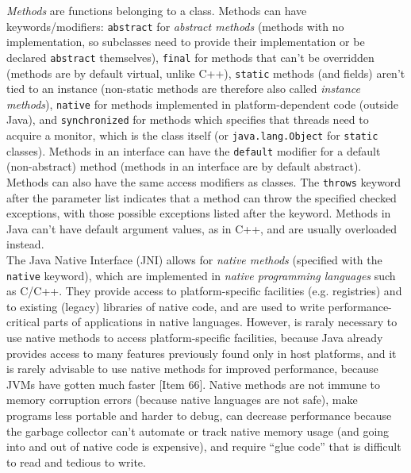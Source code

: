 \documentclass[table, xcdraw]{article}%
\begin{document}
\emph{Methods} are functions belonging to a class. Methods can have keywords/modifiers: \texttt{abstract} for \emph{abstract methods} (methods with no implementation, so subclasses need to provide their implementation or be declared \texttt{abstract} themselves), \texttt{final} for methods that can't be overridden (methods are by default virtual, unlike C++), \texttt{static} methods (and fields) aren't tied to an instance (non-static methods are therefore also called \emph{instance methods}), \texttt{native} for methods implemented in platform-dependent code (outside Java), and \texttt{synchronized} for methods which specifies that threads need to acquire a monitor, which is the class itself (or \texttt{java.lang.Object} for \texttt{static} classes). Methods in an interface can have the \texttt{default} modifier for a default (non-abstract) method (methods in an interface are by default abstract). Methods can also have the same access modifiers as classes. The \texttt{throws} keyword after the parameter list indicates that a method can throw the specified checked exceptions, with those possible exceptions listed after the keyword. Methods in Java can't have default argument values, as in C++, and are usually overloaded instead.\\
The Java Native Interface (JNI) allows for \emph{native methods} (specified with the \texttt{native} keyword), which are implemented in \emph{native programming languages} such as C/C++. They provide access to platform-specific facilities (e.g. registries) and to existing (legacy) libraries of native code, and are used to write performance-critical parts of applications in native languages. However, is raraly necessary to use native methods to access platform-specific facilities, because Java already provides access to many features previously found only in host platforms, and it is rarely advisable to use native methods for improved performance, because JVMs have gotten much faster [Item 66]. Native methods are not immune to memory corruption errors (because native languages are not safe), make programs less portable and harder to debug, can decrease performance because the garbage collector can’t automate or track native memory usage (and going into and out of native code is expensive), and require “glue code” that is difficult to read and tedious to write.
\end{document}

